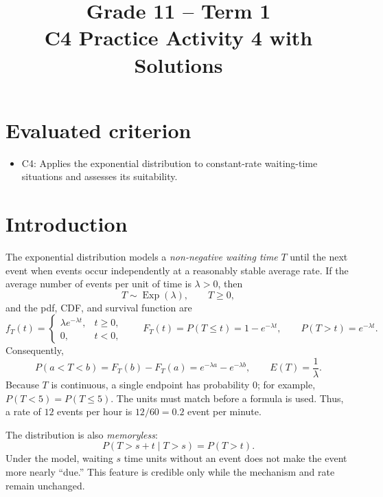 \makeatletter
{}
\makeatother



\title{Grade 11 -- Term 1 \\ C4 Practice Activity 4 with Solutions}
\author{}
\date{}


\maketitle
\setcounter{tocdepth}{1}
\setcounter{secnumdepth}{2}
\label{toc}
\tableofcontents

\section*{Evaluated criterion}
\begin{itemize}
 \item C4: Applies the exponential distribution to constant-rate waiting-time situations and assesses its suitability.
\end{itemize}

\section{Introduction}\label{sec:c4-introduction}
The exponential distribution models a \emph{non-negative waiting time} $T$
until the next event when events occur independently at a reasonably stable
average rate.  If the average number of events per unit of time is
$\lambda>0$, then
\[
 T\sim\operatorname{Exp}(\lambda),\qquad T\geq0,
\]
and the pdf, CDF, and survival function are
\[
 f_T(t)=
 \begin{cases}
  \lambda e^{-\lambda t},&t\geq0,\\
  0,&t<0,
 \end{cases}
 \qquad
 F_T(t)=P(T\leq t)=1-e^{-\lambda t},
 \qquad
 P(T>t)=e^{-\lambda t}.
\]
Consequently,
\[
 P(a<T<b)=F_T(b)-F_T(a)
 =e^{-\lambda a}-e^{-\lambda b},
 \qquad
 E(T)=\frac1\lambda.
\]
Because $T$ is continuous, a single endpoint has probability $0$; for
example, $P(T<5)=P(T\leq5)$.  The units must match before a formula is used.
Thus, a rate of $12$ events per hour is $12/60=0.2$ event per minute.

The distribution is also \emph{memoryless}:
\[
 P(T>s+t\mid T>s)=P(T>t).
\]
Under the model, waiting $s$ time units without an event does not make the
event more nearly ``due.''  This feature is credible only while the mechanism
and rate remain unchanged.

